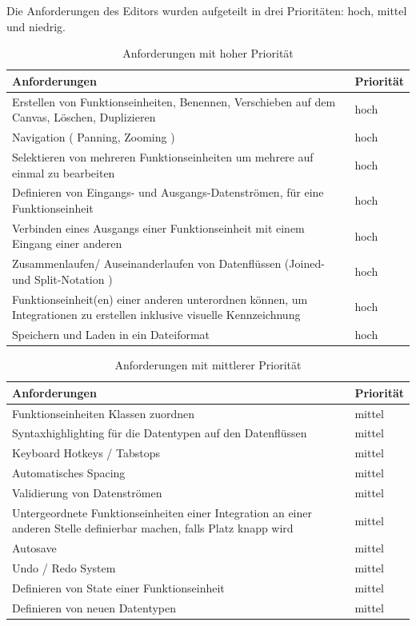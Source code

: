 Die Anforderungen des Editors wurden aufgeteilt in drei Prioritäten: hoch, mittel und niedrig.

\begin{table}[H]
\begin{tabularx}{\textwidth}{X|l}
Anforderungen & Priorität\\
\hline \hline
Erstellen von Funktionseinheiten, Benennen, Verschieben auf dem Canvas, Löschen, Duplizieren & hoch\\ \hline
Navigation ( Panning, Zooming ) & hoch\\ \hline
Selektieren von mehreren Funktionseinheiten um mehrere auf einmal zu bearbeiten & hoch\\ \hline
Definieren von Eingangs- und Ausgangs-Datenströmen, für eine Funktionseinheit & hoch\\ \hline
Verbinden eines Ausgangs einer Funktionseinheit mit einem Eingang einer anderen & hoch\\ \hline
Zusammenlaufen/ Auseinanderlaufen von Datenflüssen (Joined- und Split-Notation ) & hoch\\ \hline
Funktionseinheit(en) einer anderen unterordnen können, um Integrationen zu erstellen inklusive visuelle Kennzeichnung & hoch\\ \hline
Speichern und Laden in ein Dateiformat & hoch\\ \hline
\end{tabularx}
\caption{Anforderungen mit hoher Priorität}
\end{table}

\begin{table}[H]
\begin{tabularx}{\textwidth}{X|l}
	Anforderungen & Priorität\\
	\hline \hline
Funktionseinheiten Klassen zuordnen & mittel\\ \hline
Syntaxhighlighting für die Datentypen auf den Datenflüssen & mittel\\ \hline
Keyboard Hotkeys / Tabstops & mittel\\ \hline
Automatisches Spacing & mittel\\ \hline
Validierung von Datenströmen & mittel\\ \hline
Untergeordnete Funktionseinheiten einer Integration an einer anderen Stelle definierbar machen, falls Platz knapp wird & mittel\\ \hline
Autosave & mittel\\ \hline
Undo / Redo System & mittel\\ \hline
Definieren von State einer Funktionseinheit & mittel\\ \hline
Definieren von neuen Datentypen & mittel\\ \hline
\end{tabularx}
\caption{Anforderungen mit mittlerer Priorität}
\end{table}



